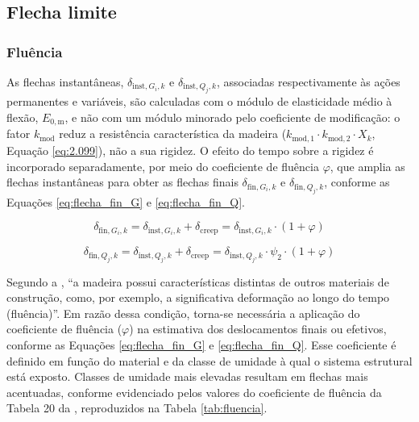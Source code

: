 \subsection{Flecha limite}\label{sec:flecha_limite}

\subsubsection{Fluência}

As flechas instantâneas, $\delta_{\mathrm{inst},G_i,k}$ e $\delta_{\mathrm{inst},Q_j,k}$, associadas respectivamente às ações permanentes e variáveis, são calculadas com o módulo de elasticidade médio à flexão, $E_{0,\mathrm{m}}$, e não com um módulo minorado pelo coeficiente de modificação: o fator $k_{\mathrm{mod}}$ reduz a resistência característica da madeira ($k_{\mathrm{mod},1} \cdot k_{\mathrm{mod},2} \cdot X_k$, Equação \ref{eq:2.099}), não a sua rigidez.
O efeito do tempo sobre a rigidez é incorporado separadamente, por meio do coeficiente de fluência $\varphi$, que amplia as flechas instantâneas para obter as flechas finais $\delta_{\mathrm{fin},G_i,k}$ e $\delta_{\mathrm{fin},Q_j,k}$, conforme as Equações \ref{eq:flecha_fin_G} e \ref{eq:flecha_fin_Q}.

\begin{equation}
\delta_{\mathrm{fin},G_i,k}
=
\delta_{\mathrm{inst},G_i,k}
+ \delta_{\mathrm{creep}}
=
\delta_{\mathrm{inst},G_i,k} \cdot (1 + \varphi)
\label{eq:flecha_fin_G}
\end{equation}

\begin{equation}
\delta_{\mathrm{fin},Q_j,k}
=
\delta_{\mathrm{inst},Q_j,k}
+ \delta_{\mathrm{creep}}
=
\delta_{\mathrm{inst},Q_j,k} \cdot \psi_{2} \cdot (1 + \varphi)
\label{eq:flecha_fin_Q}
\end{equation}

Segundo a \textcite{NBR7190-1:2022}, ``a madeira possui características distintas de outros materiais de construção, como, por exemplo, a significativa deformação ao longo do tempo (fluência)''.
Em razão dessa condição, torna-se necessária a aplicação do coeficiente de fluência ($\varphi$) na estimativa dos deslocamentos finais ou efetivos, conforme as Equações \ref{eq:flecha_fin_G} e \ref{eq:flecha_fin_Q}.
Esse coeficiente é definido em função do material e da classe de umidade à qual o sistema estrutural está exposto.
Classes de umidade mais elevadas resultam em flechas mais acentuadas, conforme evidenciado pelos valores do coeficiente de fluência da Tabela 20 da \textcite{NBR7190-1:2022}, reproduzidos na Tabela \ref{tab:fluencia}.

